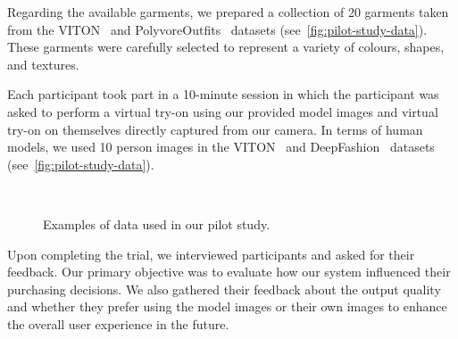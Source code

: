 Regarding the available garments, we prepared a collection of 20 garments taken from the VITON~\cite{Han-CVPR2018-Viton} and PolyvoreOutfits~\cite{Mariya-ECCV18-Learning} datasets (see~\autoref{fig:pilot-study-data}). These garments were carefully selected to represent a variety of colours, shapes, and textures.

Each participant took part in a 10-minute session in which the participant was asked to perform a virtual try-on using our provided model images and virtual try-on on themselves directly captured from our camera. In terms of human models, we used 10 person images in the VITON~\cite{Han-CVPR2018-Viton} and DeepFashion~\cite{Liu-CVPR2016-DeepFashion} datasets (see~\autoref{fig:pilot-study-data}).

\begin{figure}[h!]
    \centering
     \\
    \caption{Examples of data used in our pilot study.}
    \label{fig:pilot-study-data}
    \vspace{-2mm}
\end{figure}

Upon completing the trial, we interviewed participants and asked for their feedback. Our primary objective was to evaluate how our system influenced their purchasing decisions. We also gathered their feedback about the output quality and whether they prefer using the model images or their own images to enhance the overall user experience in the future.

